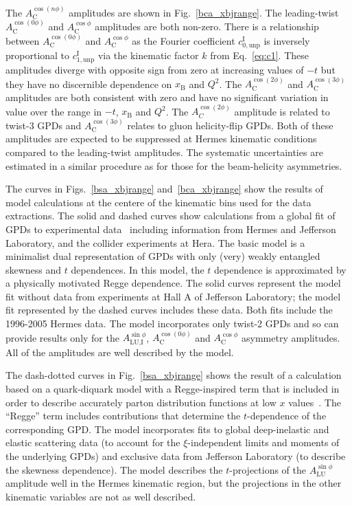 The $A_{\textrm{C}}^{\cos(n\phi)}$ amplitudes are shown in Fig.~\ref{bca_xbjrange}. The leading-twist $A_{\textrm{C}}^{\cos(0\phi)}$ and $A_{\textrm{C}}^{\cos\phi}$ amplitudes are both non-zero. There is a relationship between $A_{\textrm{C}}^{\cos(0\phi)}$ and $A_{\textrm{C}}^{\cos\phi}$ as the Fourier coefficient $c^{\textrm{I}}_{0,\textrm{unp}}$ is inversely proportional to $c^{\textrm{I}}_{1,\textrm{unp}}$ via the kinematic factor $k$ from Eq.~\ref{eq:c1}. These amplitudes diverge with opposite sign from zero at increasing values of $-t$ but they
have no discernible dependence on $x_{\textrm{B}}$ and $Q^{2}$. The $A_{\textrm{C}}^{\cos(2\phi)}$ and $A_{\textrm{C}}^{\cos(3\phi)}$ amplitudes are both consistent with zero and have no significant variation in value over the range in $-t$, $x_{\textrm{B}}$ and $Q^{2}$. The $A_{C}^{\cos(2\phi)}$ amplitude is related to twist-3 GPDs and $A_{\textrm{C}}^{\cos(3\phi)}$ relates to gluon helicity-flip GPDs. Both of these amplitudes are expected to be suppressed at H{\sc ermes} kinematic conditions compared to the leading-twist amplitudes. The systematic uncertainties are estimated in a similar procedure as for those for the beam-helicity asymmetries.

The curves in  Figs.~\ref{bsa_xbjrange} and~\ref{bca_xbjrange} show the results of model calculations at the centere of the kinematic bins used for the data extractions. The solid and dashed curves show calculations from a global fit of GPDs to experimental data~\cite{Kum09} including information from H{\sc ermes} and Jefferson Laboratory, and the collider experiments at H{\sc era}. The basic model is a minimalist dual representation of GPDs with only (very) weakly entangled skewness and $t$ dependences. In this model, the $t$ dependence is approximated by a physically motivated Regge dependence. The solid curves represent the model fit without data from experiments \cite{Cam06, Gir08} at Hall A of Jefferson Laboratory; the model fit represented by the dashed curves includes these data. Both fits include the 1996-2005 H{\sc ermes} data. The model incorporates only twist-2 GPDs and so can provide results only for the $A_{\textrm{LU,I}}^{\sin\phi}$, $A_{\textrm{C}}^{\cos(0\phi)}$ and $A_{\textrm{C}}^{\cos\phi}$ asymmetry amplitudes. All of the amplitudes are well described by the model.

The dash-dotted curves in Fig.~\ref{bsa_xbjrange} shows the result of a calculation based on a quark-diquark model with a Regge-inspired term that is included in order to describe accurately parton distribution functions at low $x$ values~\cite{Liu11}. The ``Regge'' term includes contributions that determine the $t$-dependence of the corresponding GPD. The model incorporates fits to global deep-inelastic and elastic scattering data (to account for the $\xi$-independent limits and moments of the underlying GPDs) and exclusive data from Jefferson Laboratory (to describe the skewness dependence). The model describes the $t$-projections of the $A^{\sin\phi}_{\textrm{LU}}$ amplitude well in the H{\sc ermes} kinematic region, but the projections in the other kinematic variables are not as well described.

